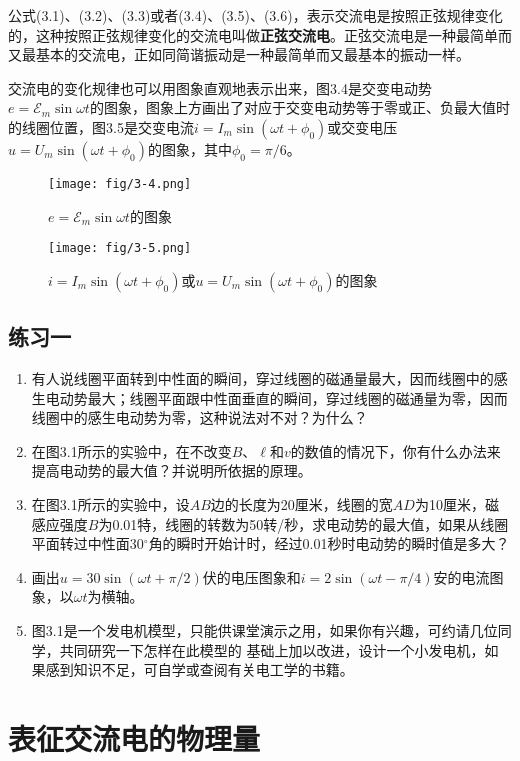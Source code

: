 公式(3.1)、(3.2)、(3.3)或者(3.4)、(3.5)、(3.6)，表示交流电是按照正弦规律变化的，这种按照正弦规律变化的交流电叫做\textbf{正弦交流电}。正弦交流电是一种最简单而又最基本的交流电，正如同简谐振动是一种最简单而又最基本的振动一样。
	
	
交流电的变化规律也可以用图象直观地表示出来，图3.4是交变电动势$e=\mathcal{E}_m \sin \omega t$的图象，图象上方画出了对应于交变电动势等于零或正、负最大值时的线圈位置，图3.5是交变电流$i=I_m\sin(\omega t+\phi_0)$或交变电压 $u=U_m\sin(\omega t+\phi_0)$的图象，其中$\phi_0=\pi/6$。
\begin{figure}[htp]\centering
\texttt{[image: fig/3-4.png]}
\caption{$e=\mathcal{E}_m \sin \omega t$的图象}
\end{figure}
\begin{figure}[htp]\centering
\texttt{[image: fig/3-5.png]}
\caption{$i=I_m\sin(\omega t+\phi_0)$或$u=U_m\sin(\omega t+\phi_0)$的图象}
\end{figure}



\subsection*{练习一}
\begin{enumerate}
    \item 有人说线圈平面转到中性面的瞬间，穿过线圈的磁通量最大，因而线圈中的感生电动势最大；线圈平面跟中性面垂直的瞬间，穿过线圈的磁通量为零，因而线圈中的感生电动势为零，这种说法对不对？为什么？
    \item 在图3.1所示的实验中，在不改变$B$、$\ell$和$v$的数值的情况下，你有什么办法来提高电动势的最大值？并说明所依据的原理。
    \item 在图3.1所示的实验中，设$AB$边的长度为20厘米，线圈的宽$AD$为10厘米，磁感应强度$B$为0.01特，线圈的转数为50转/秒，求电动势的最大值，如果从线圈平面转过中性面30$^\circ$角的瞬时开始计时，经过0.01秒时电动势的瞬时值是多大？
    \item 画出$u=30\sin(\omega t+\pi/2)$伏的电压图象和$i=2\sin(\omega t-\pi/4)$安的电流图象，以$\omega t$为横轴。
    \item 图3.1是一个发电机模型，只能供课堂演示之用，如果你有兴趣，可约请几位同学，共同研究一下怎样在此模型的	
	基础上加以改进，设计一个小发电机，如果感到知识不足，可自学或查阅有关电工学的书籍。
\end{enumerate}


\section{表征交流电的物理量}

